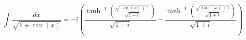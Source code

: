 \documentclass[a4paper,titlepage] {scrartcl}
\begin{document}

\begin{equation}
	\int\frac{dx}{\sqrt{1+\tan(x)}}
	=
	-i\left(
	\frac{\tanh^{-1}\left(\frac{\sqrt{\tan{(x)}+1}}{\sqrt{1-i}}\right)}
	{\sqrt{1-i}}
	-
	\frac{\tanh^{-1}\left(\frac{\sqrt{\tan{(x)}+1}}{\sqrt{1+i}}\right)}
	{\sqrt{1+i}}
	\right)
\end{equation}
\end{document}
